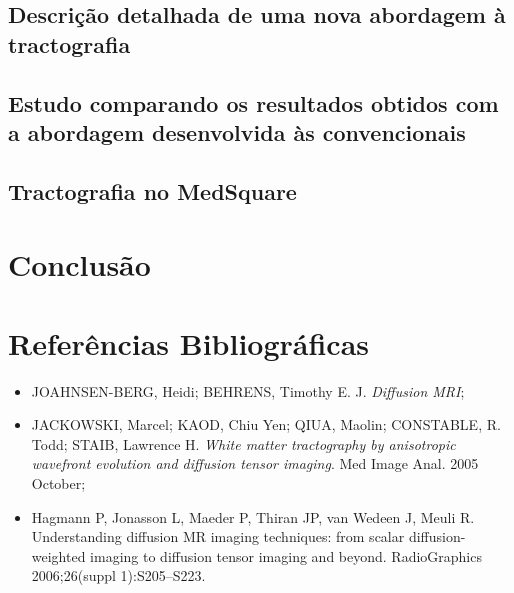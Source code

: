 \documentclass[a4paper,11pt]{report}
\begin{document}
  \section{Descrição detalhada de uma nova abordagem à tractografia}
  
  \section{Estudo comparando os resultados obtidos com a abordagem desenvolvida às convencionais}
  
  \section{Tractografia no MedSquare}

\chapter{Conclusão}

\chapter{Referências Bibliográficas}

\begin{itemize}
  \item JOAHNSEN-BERG, Heidi; BEHRENS, Timothy E. J. \textit{Diffusion MRI};
  \item JACKOWSKI, Marcel; KAOD, Chiu Yen; QIUA, Maolin; CONSTABLE, R. Todd; STAIB, Lawrence H. \textit{White matter tractography by anisotropic wavefront evolution and diffusion tensor imaging}. Med Image Anal. 2005 October;
  \item Hagmann P, Jonasson L, Maeder P, Thiran JP, van Wedeen J, Meuli R. Understanding diffusion MR imaging techniques: from scalar diffusion-weighted imaging to diffusion tensor imaging and beyond. RadioGraphics 2006;26(suppl 1):S205–S223.
\end{itemize}
\end{document}

